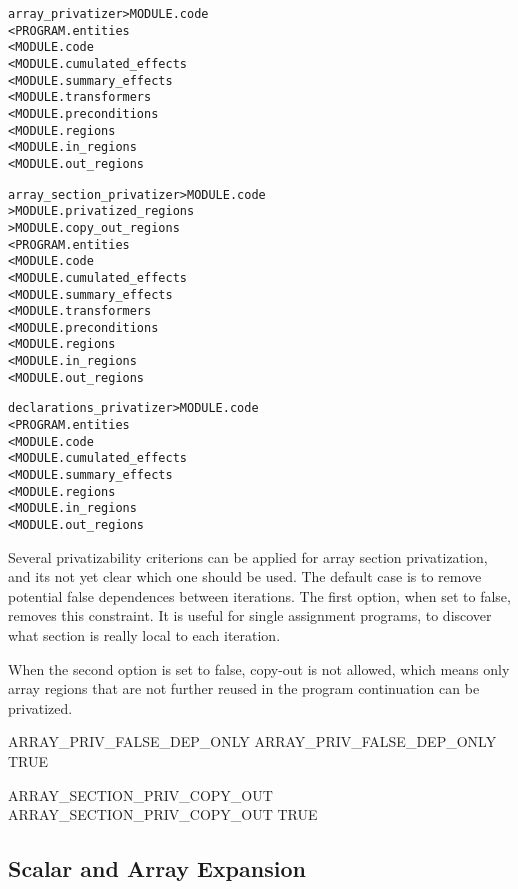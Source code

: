 \documentclass[a4paper]{report}
\newenvironment{PipsMake}{\begin{alltt}}{\end{alltt}}
\begin{document}
\begin{PipsMake}
array_privatizer             > MODULE.code
        < PROGRAM.entities
        < MODULE.code
        < MODULE.cumulated_effects
        < MODULE.summary_effects
        < MODULE.transformers
        < MODULE.preconditions
        < MODULE.regions
        < MODULE.in_regions
        < MODULE.out_regions

array_section_privatizer             > MODULE.code
                                     > MODULE.privatized_regions
                                     > MODULE.copy_out_regions
        < PROGRAM.entities
        < MODULE.code
        < MODULE.cumulated_effects
        < MODULE.summary_effects
        < MODULE.transformers
        < MODULE.preconditions
        < MODULE.regions
        < MODULE.in_regions
        < MODULE.out_regions

declarations_privatizer              > MODULE.code
        < PROGRAM.entities
        < MODULE.code
        < MODULE.cumulated_effects
        < MODULE.summary_effects
        < MODULE.regions
        < MODULE.in_regions
        < MODULE.out_regions

\end{PipsMake}

Several privatizability criterions can be applied for array
section privatization, and its not yet clear which one should be used. The
default case is to remove potential false dependences between
iterations. The first option, when set to false, removes this
constraint. It is useful for single assignment programs, to discover
what section is really local to each iteration.

When the second option is set to false, copy-out is not allowed,
which means only array regions that are not further reused in the program
continuation can be privatized.

\begin{PipsProp}{ARRAY_PRIV_FALSE_DEP_ONLY}
ARRAY_PRIV_FALSE_DEP_ONLY TRUE
\end{PipsProp}

\begin{PipsProp}{ARRAY_SECTION_PRIV_COPY_OUT}
ARRAY_SECTION_PRIV_COPY_OUT TRUE
\end{PipsProp}


\subsection{Scalar and Array Expansion}
\label{subsection-scalar-and-array-expansion}
\end{document}
